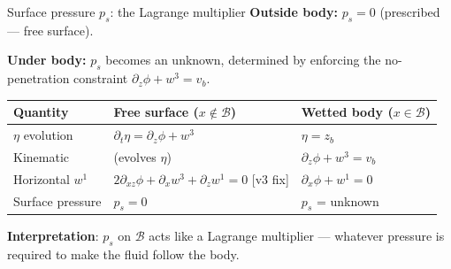 \documentclass[aspectratio=169, 10pt]{beamer}
\begin{document}
\begin{frame}{Surface pressure $p_s$: the Lagrange multiplier}
\textbf{Outside body:} $p_s = 0$ (prescribed — free surface).

\vspace{0.5em}
\textbf{Under body:} $p_s$ becomes an \alert{unknown}, determined by enforcing the no-penetration constraint $\partial_z\phi + w^3 = v_b$.

\vspace{0.5em}
\begin{center}
\footnotesize
\begin{tabular}{@{}lll@{}}
\toprule
Quantity & Free surface ($x \notin \mathcal{B}$) & Wetted body ($x \in \mathcal{B}$) \\
\midrule
$\eta$ evolution & $\partial_t \eta = \partial_z\phi + w^3$ & $\eta = z_b$ \\
Kinematic & (evolves $\eta$) & $\partial_z\phi + w^3 = v_b$ \\
Horizontal $w^1$ & $2\partial_{xz}\phi + \partial_x w^3 + \partial_z w^1 = 0$ \alert{[v3 fix]} & $\partial_x\phi + w^1 = 0$ \\
Surface pressure & $p_s = 0$ & $p_s$ = unknown \\
\bottomrule
\end{tabular}
\end{center}

\vspace{0.5em}
\textbf{Interpretation}: $p_s$ on $\mathcal{B}$ acts like a Lagrange multiplier — whatever pressure is required to make the fluid follow the body.
\end{frame}
\end{document}
